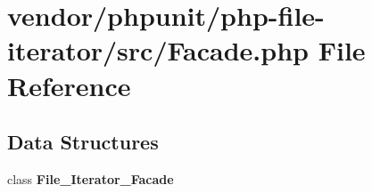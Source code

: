 \section{vendor/phpunit/php-\/file-\/iterator/src/\+Facade.php File Reference}
\label{phpunit_2php-file-iterator_2src_2_facade_8php}
\subsection*{Data Structures}
\begin{DoxyCompactItemize}
\item 
class {\bf File\+\_\+\+Iterator\+\_\+\+Facade}
\end{DoxyCompactItemize}
